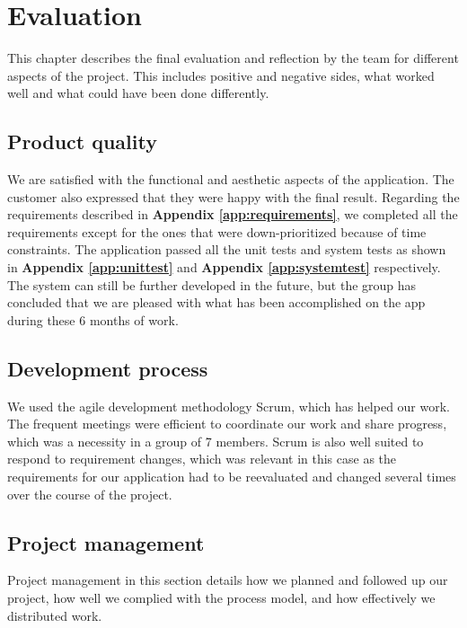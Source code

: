 
\chapter{Evaluation}

This chapter describes the final evaluation and reflection by the team for different aspects of the project. This includes positive and negative sides, what worked well and what could have been done differently.

\section{Product quality}

We are satisfied with the functional and aesthetic aspects of the application. The customer also expressed that they were happy with the final result. Regarding the requirements described in \textbf{Appendix \ref{app:requirements}}, we completed all the requirements except for the ones that were down-prioritized because of time constraints.
The application passed all the unit tests and system tests as shown in \textbf{Appendix \ref{app:unittest}} and \textbf{Appendix \ref{app:systemtest}} respectively. The system can still be further developed in the future, but the group has concluded that we are pleased with what has been accomplished on the app during these 6 months of work.

\section{Development process}

We used the agile development methodology Scrum, which has helped our work. The frequent meetings were efficient to coordinate our work and share progress, which was a necessity in a group of 7 members. Scrum is also well suited to respond to requirement changes, which was relevant in this case as the requirements for our application had to be reevaluated and changed several times over the course of the project.

\section{Project management}

Project management in this section details how we planned and followed up our project, how well we complied with the process model, and how effectively we distributed work.\newline


